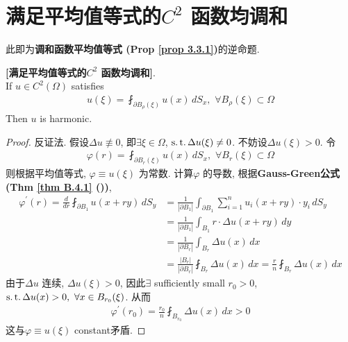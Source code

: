 \newpage

\section{满足平均值等式的$C^2$ 函数均调和}
	此即为\textbf{调和函数平均值等式 (Prop \ref{prop 3.3.1})}的逆命题. 
	
	\begin{thm}\label{thm A.5.1}
		\textbf{[满足平均值等式的$C^2$ 函数均调和]}. \\
		If $u \in C^2(\Omega)$ satisfies
		\begin{align*}
			u(\xi) = \fint_{\partial B_{\rho}(\xi)} u(x) \, dS_x , \,\, \forall B_{\rho}(\xi) \subset \Omega
		\end{align*}
		Then $u$ is harmonic. 
		
		\vspace*{6em}
		
		\begin{proof}
			反证法. 假设$\Delta u \not\equiv 0$, 即$\exists \xi \in \Omega$, $\operatorname{s.t.} \Delta u(\xi) \neq 0$. 不妨设$\Delta u(\xi) > 0$. 令
			\begin{align*}
				\varphi(r) = \fint_{\partial B_{r}(\xi)} u(x) \, dS_x , \,\, \forall B_{r}(\xi) \subset \Omega
			\end{align*}
			则根据平均值等式, $\varphi \equiv u(\xi)$ 为常数. 计算$\varphi$ 的导数, 根据\textbf{Gauss-Green公式 (Thm \ref{thm B.4.1} ())}, 
			\begin{align*}
				\varphi^{'}(r) 
				= \frac{d}{dr} \fint_{\partial B_{1}} u(x + ry) \, dS_y 
				&= \frac{1}{| \partial B_1 |} \int_{\partial B_1} \sum_{i = 1}^n u_{i}(x + ry) \cdot y_i \, dS_y \\
				&= \frac{1}{| \partial B_1 |} \int_{B_1} r \cdot \Delta u(x + ry) \, dy \\
				&= \frac{1}{| \partial B_r |} \int_{B_r} \Delta u(x) \, dx \\
				&= \frac{| B_r |}{| \partial B_r |} \fint_{B_r} \Delta u(x) \, dx 
				= \frac{r}{n} \fint_{B_r} \Delta u(x) \, dx
			\end{align*}
			由于$\Delta u$ 连续, $\Delta u (\xi) > 0$, 因此$\exists$ sufficiently small $r_0 > 0$, $\operatorname{s.t.} \Delta u(x) > 0 , \,\, \forall x \in B_{r_0}(\xi)$. 从而 
			\begin{align*}
				\varphi^{'}(r_0) 
				= \frac{r_0}{n} \fint_{B_{r_0}} \Delta u(x) \, dx > 0
			\end{align*}
			这与$\varphi \equiv u(\xi)$ constant矛盾. 
		\end{proof}
	\end{thm}







